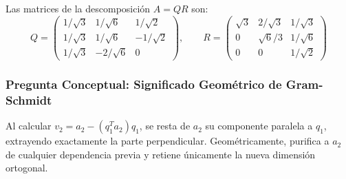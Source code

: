 \documentclass[11pt,a4paper]{article}
\theoremstyle{definition}
\theoremstyle{remark}
\begin{document}
Las matrices de la descomposición $A = QR$ son:
\begin{equation}
    Q = \begin{pmatrix}
        1/\sqrt{3} & 1/\sqrt{6} & 1/\sqrt{2} \\
        1/\sqrt{3} & 1/\sqrt{6} & -1/\sqrt{2} \\
        1/\sqrt{3} & -2/\sqrt{6} & 0
    \end{pmatrix}, \qquad
    R = \begin{pmatrix}
        \sqrt{3} & 2/\sqrt{3} & 1/\sqrt{3} \\
        0 & \sqrt{6}/3 & 1/\sqrt{6} \\
        0 & 0 & 1/\sqrt{2}
    \end{pmatrix}
\end{equation}

\subsubsection{Pregunta Conceptual: Significado Geométrico de Gram-Schmidt}
Al calcular $v_2 = a_2 - (q_1^T a_2)q_1$, se resta de $a_2$ su componente paralela a $q_1$, extrayendo exactamente la parte perpendicular. Geométricamente, purifica a $a_2$ de cualquier dependencia previa y retiene únicamente la nueva dimensión ortogonal.
\end{document}
